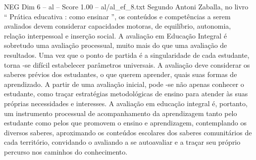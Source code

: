 \begin{textsample}{NEG Dim 6 – al – Score 1.00 – al/al\_ef\_8.txt}
Segundo Antoni Zaballa, no livro “ Prática educativa : como ensinar ”, os conteúdos e competências a serem avaliados devem considerar capacidades motoras, de equilíbrio, autonomia, relação interpessoal e inserção social.
A avaliação em Educação Integral é sobretudo uma avaliação processual, muito mais do que uma avaliação de resultados.
Uma vez que o ponto de partida é a singularidade de cada estudante, torna -se difícil estabelecer parâmetros universais.
A avaliação deve considerar os saberes prévios dos estudantes, o que querem aprender, quais suas formas de aprendizado.
A partir de uma avaliação inicial, pode -se não apenas conhecer o estudante, como traçar estratégias metodológicas de ensino para atender às suas próprias necessidades e interesses.
A avaliação em educação integral é, portanto, um instrumento processual de acompanhamento da aprendizagem tanto pelo estudante como pelos que promovem o ensino e aprendizagem, contemplando os diversos saberes, aproximando os conteúdos escolares dos saberes comunitários de cada território, convidando o avaliando a se autoavaliar e a traçar seu próprio percurso nos caminhos do conhecimento.

\end{textsample}
